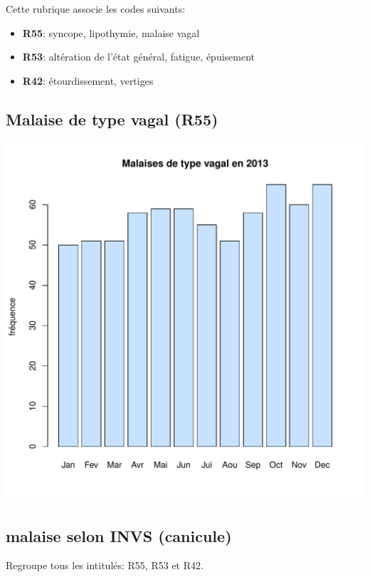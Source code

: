 \documentclass[12pt,english,french,twoside]{book}\usepackage[]{graphicx}\usepackage[]{color}
\makeatletter
\def\maxwidth{ %
  \ifdim\Gin@nat@width>\linewidth
    \linewidth
  \else
    \Gin@nat@width
  \fi
}
\newenvironment{knitrout}{}{} %
\makeatother
\begin{document}
Cette rubrique associe les codes suivants:

\begin{itemize}
  \item \textbf{R55}: syncope, lipothymie, malaise vagal
  \item \textbf{R53}: altération de l'état général, fatigue, épuisement
  \item \textbf{R42}: étourdissement, vertiges
\end{itemize}

\subsection*{Malaise de type vagal (R55)}

\begin{knitrout}
\color{fgcolor}
\includegraphics[width=\maxwidth]{figure/malaises-1} 

\end{knitrout}

\subsection*{malaise selon INVS (canicule)}

Regroupe tous les intitulés: R55, R53 et R42.
\end{document}
